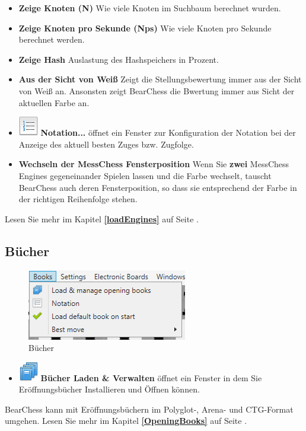 \documentclass[11pt,a4paper]{article}
\begin{document}
	\begin{itemize}
		\item  \textbf{Zeige Knoten (N)} Wie viele Knoten im Suchbaum berechnet wurden.
		\item \textbf{Zeige Knoten pro Sekunde (Nps)} Wie viele Knoten pro Sekunde berechnet werden.
		\item \textbf{Zeige Hash} Auslastung des Hashspeichers in Prozent.
		\item \textbf{Aus der Sicht von Weiß} Zeigt die Stellungsbewertung immer aus der Sicht von Weiß an. Ansonsten zeigt BearChess die Bwertung immer aus Sicht der aktuellen Farbe an.
		\item  \includegraphics[scale=0.5]{text_list_numbers.png} \textbf{Notation...} öffnet ein Fenster zur Konfiguration der Notation bei der Anzeige des aktuell besten Zuges bzw. Zugfolge.
		\item \textbf{Wechseln der MessChess Fensterposition} Wenn Sie \textbf{zwei} MessChess Engines gegeneinander Spielen lassen und die Farbe wechselt, tauscht BearChess auch deren Fensterposition, so dass sie entsprechend der Farbe in der richtigen Reihenfolge stehen.
	\end{itemize}
	
	Lesen Sie mehr im Kapitel \textbf{\ref{loadEngines}  } auf Seite \pageref{loadEngines}.
	
	\subsection{Bücher}
	\begin{figure}[H]
		\centering
		\includegraphics[scale=1.0]{Books.png}
		\caption{Bücher}
		\label{fig:Books}
	\end{figure}
	\begin{itemize}
		\item \includegraphics[scale=0.5]{books_stack.png} \textbf{Bücher Laden \& Verwalten} öffnet ein Fenster in dem Sie Eröffnungsbücher Installieren und Öffnen können.
	\end{itemize}
	BearChess kann mit Eröffnungsbüchern im Polyglot-, Arena- und CTG-Format umgehen. Lesen Sie mehr im Kapitel \textbf{\ref{OpeningBooks}  } auf Seite \pageref{OpeningBooks}.
	
\end{document}
